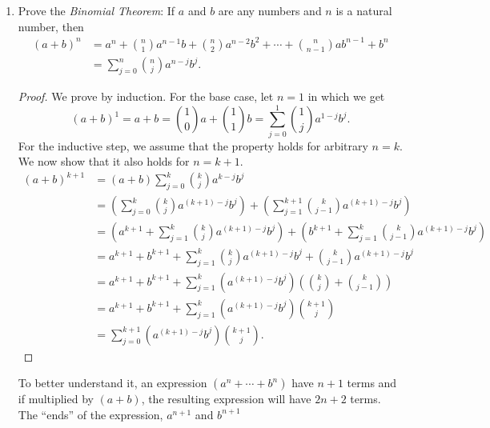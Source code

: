\begin{exercise}[\textbf{3}]
\begin{enumerate}
         \pagebreak
         \item Prove the \emph{Binomial Theorem}: If $a$ and $b$ are any
         numbers and $n$ is a natural number, then 
         \begin{align*}
             (a+b)^n &= a^n+\binom{n}{1}a^{n-1}b+\binom{n}{2}a^{n-2}b^2 +\dotsb +\binom{n}{n-1}ab^{n-1}+b^n \\
             &= \sum \limits_{j=0}^{n}\binom{n}{j}a^{n-j}b^j.
         \end{align*}
         \begin{proof}We prove by induction. For the base case, let $n=1$ in which we get
              \begin{equation*}
                  (a+b)^1=a+b = \binom{1}{0}a+\binom{1}{1}b = \sum\limits_{j=0}^{1}\binom{1}{j}a^{1-j}b^j.
              \end{equation*}
              For the inductive step, we assume that the property holds for
              arbitrary $n=k$. We now show that it also holds for $n=k+1$.
              \begin{align*}
                  (a+b)^{k+1}&=(a+b)\sum\limits_{j=0}^{k}\binom{k}{j}a^{k-j}b^{j} \\
                  &= \left( \sum\limits_{j=0}^{k}\binom{k}{j}a^{(k+1)-j}b^{j} \right)+ \left(\sum\limits_{j=1}^{k+1}\binom{k}{j-1}a^{(k+1)-j}b^{j}\right) \\
                  &= \left( a^{k+1}+\sum\limits_{j=1}^{k}\binom{k}{j}a^{(k+1)-j}b^{j}\right) +\left( b^{k+1}+\sum\limits_{j=1}^{k}\binom{k}{j-1}a^{(k+1)-j}b^{j}\right) \\
                  &= a^{k+1}+b^{k+1}+\sum\limits_{j=1}^{k}\binom{k}{j}a^{(k+1)-j}b^{j} + \binom{k}{j-1}a^{(k+1)-j}b^{j} \\
                  &= a^{k+1}+b^{k+1}+\sum\limits_{j=1}^{k} (a^{(k+1)-j}b^{j})\left( \binom{k}{j}+\binom{k}{j-1}\right) \\ 
                  &= a^{k+1}+b^{k+1}+\sum\limits_{j=1}^{k} (a^{(k+1)-j}b^{j}) \binom{k+1}{j} \\
                  &= \sum\limits_{j=0}^{k+1} (a^{(k+1)-j}b^{j}) \binom{k+1}{j}.
              \end{align*}
         \end{proof}
         \begin{remark}
         To better understand it, an expression $(a^n+\dotsb+b^n)$ have $n+1$
         terms and if multiplied by $(a+b)$, the resulting expression will have
         $2n+2$ terms. The ``ends'' of the expression, $a^{n+1}$ and $b^{n+1}$

\end{remark}
\end{enumerate}
\end{exercise}
